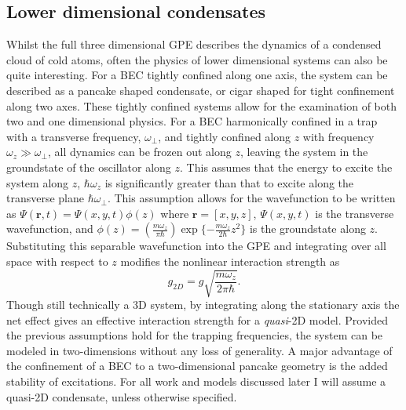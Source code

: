 \subsection{Lower dimensional condensates}\label{sub:coldatom_recent}
Whilst the full three dimensional GPE describes the dynamics of a condensed cloud of cold atoms, often the physics of lower dimensional systems can also be quite interesting. For a BEC tightly confined along one axis, the system can be described as a pancake shaped condensate, or cigar shaped for tight confinement along two axes. These tightly confined systems allow for the examination of both two and one dimensional physics. For a BEC harmonically confined in a trap with a transverse frequency, $\omega_\perp$, and tightly confined along $z$ with frequency $\omega_z \gg \omega_\perp$, all dynamics can be frozen out along $z$, leaving the system in the groundstate of the oscillator along $z$. This assumes that the energy to excite the system along $z$, $\hbar\omega_z$ is significantly greater than that to excite along the transverse plane $\hbar\omega_\perp$. This assumption allows for the wavefunction to be written as $\Psi(\mathbf{r},t) = \Psi(x,y,t)\phi(z)$ where $\mathbf{r} = [x,y,z]$, $\Psi(x,y,t)$ is the transverse wavefunction, and $\phi(z) = \left(\frac{m\omega_z}{\pi\hbar}\right)\exp\{-\frac{m\omega_z}{2\hbar}z^2\}$ is the groundstate along $z$.
Substituting this separable wavefunction into the GPE and integrating over all space with respect to $z$ modifies the nonlinear interaction strength as~\cite{BK:Pethick_Smith_2008}
\begin{equation}\label{eqn:g2d_efint}
    g_{2D} = g\sqrt{\frac{m\omega_z}{2\pi\hbar}}.
\end{equation}
Though still technically a 3D system, by integrating along the stationary axis the net effect gives an effective interaction strength for a \textit{quasi}-2D model. Provided the previous assumptions hold for the trapping frequencies, the system can be modeled in two-dimensions without any loss of generality. A major advantage of the confinement of a BEC to a two-dimensional pancake geometry is the added stability of excitations. For all work and models discussed later I will assume a quasi-2D condensate, unless otherwise specified. %

